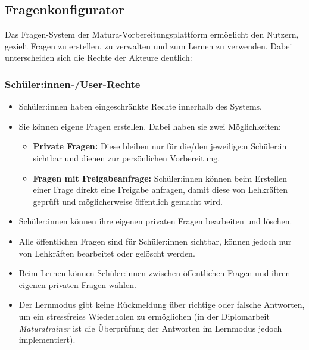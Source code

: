\setauthor{\firstauthor}
\subsection{Fragenkonfigurator}
Das Fragen-System der Matura-Vorbereitungsplattform ermöglicht den Nutzern, gezielt Fragen zu erstellen, zu verwalten und zum Lernen zu verwenden. Dabei unterscheiden sich die Rechte der Akteure deutlich:

\subsubsection{Schüler:innen-/User-Rechte}
\begin{itemize}
    \item Schüler:innen haben eingeschränkte Rechte innerhalb des Systems.
    \item Sie können eigene Fragen erstellen. Dabei haben sie zwei Möglichkeiten:
    \begin{itemize}
        \item \textbf{Private Fragen:} Diese bleiben nur für die/den jeweilige:n Schüler:in sichtbar und dienen zur persönlichen Vorbereitung.
        \item \textbf{Fragen mit Freigabeanfrage:} Schüler:innen können beim Erstellen einer Frage direkt eine Freigabe anfragen, damit diese von Lehkräften geprüft und möglicherweise öffentlich gemacht wird.
    \end{itemize}
    \item Schüler:innen können ihre eigenen privaten Fragen bearbeiten und löschen.
    \item Alle öffentlichen Fragen sind für Schüler:innen sichtbar, können jedoch nur von Lehkräften bearbeitet oder gelöscht werden.
    \item Beim Lernen können Schüler:innen zwischen öffentlichen Fragen und ihren eigenen privaten Fragen wählen.
    \item Der Lernmodus gibt keine Rückmeldung über richtige oder falsche Antworten, um ein stressfreies Wiederholen zu ermöglichen (in der Diplomarbeit \textit{Maturatrainer} ist die Überprüfung der Antworten im Lernmodus jedoch implementiert).
\end{itemize}

